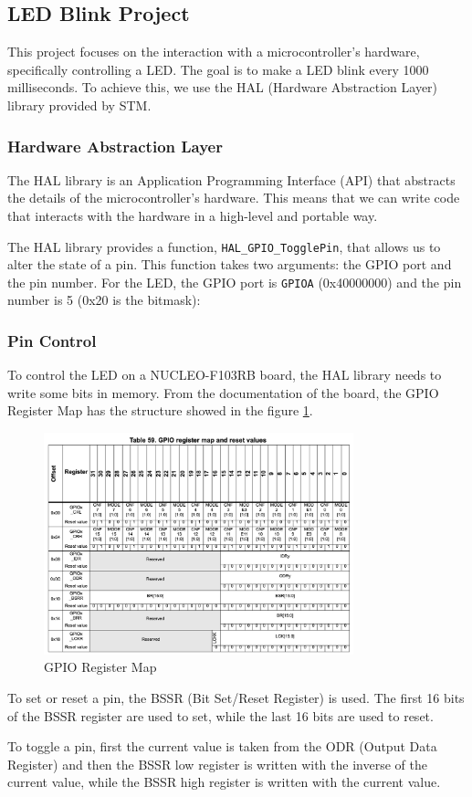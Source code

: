\subsection{LED Blink Project}

This project focuses on the interaction with a microcontroller's hardware, specifically controlling a LED. The goal is to make a LED blink every 1000 milliseconds. To achieve this, we use the HAL (Hardware Abstraction Layer) library provided by STM.

\subsubsection{Hardware Abstraction Layer}

The HAL library is an Application Programming Interface (API) that abstracts the details of the microcontroller's hardware. This means that we can write code that interacts with the hardware in a high-level and portable way.

The HAL library provides a function, \texttt{HAL\_GPIO\_TogglePin}, that allows us to alter the state of a pin. This function takes two arguments: the GPIO port and the pin number. For the LED, the GPIO port is \texttt{GPIOA} (0x40000000) and the pin number is 5 (0x20 is the bitmask):

\subsubsection{Pin Control}

To control the LED on a NUCLEO-F103RB board, the HAL library needs to write some bits in memory. From the documentation of the board, the GPIO Register Map has the structure showed in the figure \ref{fig:gpio_register_map}.

\begin{figure}[ht]
    \centering
    \includegraphics[width=0.8\textwidth]{images/projects/gpio_register_map.png}
    \caption{GPIO Register Map}
    \label{fig:gpio_register_map}
\end{figure}

To set or reset a pin, the BSSR (Bit Set/Reset Register) is used. The first 16 bits of the BSSR register are used to set, while the last 16 bits are used to reset.

To toggle a pin, first the current value is taken from the ODR (Output Data Register) and then the BSSR low register is written with the inverse of the current value, while the BSSR high register is written with the current value.